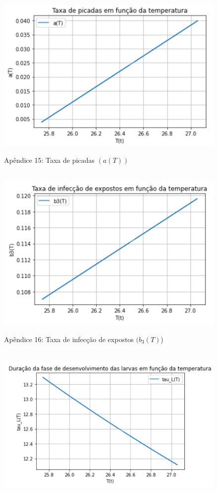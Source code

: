 \documentclass[
	12pt,				%
	oneside,			%
	a4paper,			%
	english,			%
	brazil				%
	]{abntex2}
\begin{document}
\begin{apendicesenv}
\begin{figure}[!ht]
\end{figure}
\newpage
\begin{figure}[!ht]
	\centering
	\hbox{\hspace{4.0em} \includegraphics[scale=1.0] {Plot_a(T).png}}
	\caption*{Apêndice 15: Taxa de picadas $(a(T))$} 
\end{figure} 
\begin{figure}[!ht]
	\centering
	\hbox{\hspace{4.0em} \includegraphics[scale=1.0] {Plot_b3(T).png}}
	\caption*{Apêndice 16: Taxa de infecção de expostos $(b_3(T)$)} 
\end{figure} 
\newpage
\begin{figure}[!ht]
	\centering
	\hbox{\hspace{2.3em} \includegraphics[scale=1.0] {Plot_tau_L(T)_corrigido.png}}

\end{figure}
\end{apendicesenv}
\end{document}
